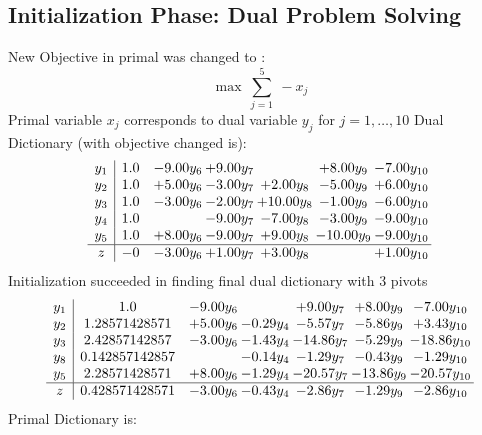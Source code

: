 \documentclass[8pt]{article}
\begin{document}
\subsection{Initialization Phase: Dual Problem Solving}
New Objective in primal was changed to : \[ \max\ \sum_{j=1}^{5}\ - x_j \] 
Primal variable $x_j$ corresponds to dual variable $y_j$ for $j = 1,\ldots,10$
Dual Dictionary (with objective changed is): 
\[\begin{array}{c| c c@{\hskip 2pt} c@{\hskip 2pt} c@{\hskip 2pt} c@{\hskip 2pt} c@{\hskip 2pt} }
 y_{1}   &  1.0 & -9.00 y_{6} & +  9.00 y_{7} &   & +  8.00 y_{9} & -7.00 y_{10}\\
 y_{2}   &  1.0 & +  5.00 y_{6} & -3.00 y_{7} & +  2.00 y_{8} & -5.00 y_{9} & +  6.00 y_{10}\\
 y_{3}   &  1.0 & -3.00 y_{6} & -2.00 y_{7} & + 10.00 y_{8} & -1.00 y_{9} & -6.00 y_{10}\\
 y_{4}   &  1.0  &   & -9.00 y_{7} & -7.00 y_{8} & -3.00 y_{9} & -9.00 y_{10}\\
 y_{5}   &  1.0 & +  8.00 y_{6} & -9.00 y_{7} & +  9.00 y_{8} & -10.00 y_{9} & -9.00 y_{10}\\
\hline
z    &  -0 & -3.00 y_{6} & +  1.00 y_{7} & +  3.00 y_{8} &   & +  1.00 y_{10}\\
\end{array}\]
Initialization succeeded in finding final dual dictionary with 3 pivots
\[\begin{array}{c| c c@{\hskip 2pt} c@{\hskip 2pt} c@{\hskip 2pt} c@{\hskip 2pt} c@{\hskip 2pt} }
 y_{1}   &  1.0 & -9.00 y_{6} &   & +  9.00 y_{7} & +  8.00 y_{9} & -7.00 y_{10}\\
 y_{2}   &  1.28571428571 & +  5.00 y_{6} & -0.29 y_{4} & -5.57 y_{7} & -5.86 y_{9} & +  3.43 y_{10}\\
 y_{3}   &  2.42857142857 & -3.00 y_{6} & -1.43 y_{4} & -14.86 y_{7} & -5.29 y_{9} & -18.86 y_{10}\\
 y_{8}   &  0.142857142857  &   & -0.14 y_{4} & -1.29 y_{7} & -0.43 y_{9} & -1.29 y_{10}\\
 y_{5}   &  2.28571428571 & +  8.00 y_{6} & -1.29 y_{4} & -20.57 y_{7} & -13.86 y_{9} & -20.57 y_{10}\\
\hline
z    &  0.428571428571 & -3.00 y_{6} & -0.43 y_{4} & -2.86 y_{7} & -1.29 y_{9} & -2.86 y_{10}\\
\end{array}\]
Primal Dictionary is:
\end{document}
